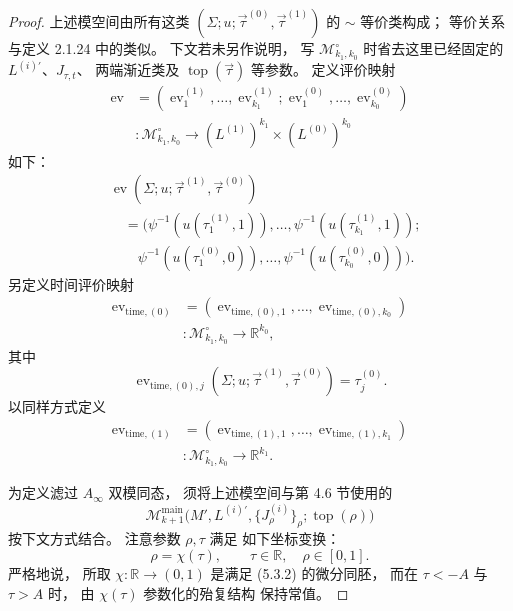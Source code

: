 \begin{proof}
上述模空间由所有这类
$(\Sigma;u;\vec\tau^{(0)},\vec\tau^{(1)})$
的 $\sim$ 等价类构成；
等价关系与定义 2.1.24 中的类似。
下文若未另作说明，
写 $\mathcal M^\circ_{k_1,k_0}$
时省去这里已经固定的
$L^{(i)\prime}$、$J_{\tau,t}$、
两端渐近类及 $\operatorname{top}(\vec\tau)$
等参数。
定义评价映射
\[
\begin{aligned}
\operatorname{ev}
&=(\operatorname{ev}^{(1)}_1,\ldots,
 \operatorname{ev}^{(1)}_{k_1};
 \operatorname{ev}^{(0)}_1,\ldots,
 \operatorname{ev}^{(0)}_{k_0})
\\
&\colon
\mathcal M^\circ_{k_1,k_0}
\longrightarrow
(L^{(1)})^{k_1}\times(L^{(0)})^{k_0}
\end{aligned}
\]
如下：
\[
\begin{aligned}
&\operatorname{ev}
(\Sigma;u;\vec\tau^{(1)},\vec\tau^{(0)})
\\
&\quad=
\bigl(
 \psi^{-1}(u(\tau^{(1)}_1,1)),\ldots,
 \psi^{-1}(u(\tau^{(1)}_{k_1},1));
\\
&\qquad
 \psi^{-1}(u(\tau^{(0)}_1,0)),\ldots,
 \psi^{-1}(u(\tau^{(0)}_{k_0},0))
\bigr).
\end{aligned}
\]
另定义时间评价映射
\[
\begin{aligned}
\operatorname{ev}_{\mathrm{time},(0)}
&=(\operatorname{ev}_{\mathrm{time},(0),1},
  \ldots,
  \operatorname{ev}_{\mathrm{time},(0),k_0})
\\
&\colon\mathcal M^\circ_{k_1,k_0}
\longrightarrow\mathbb R^{k_0},
\end{aligned}
\]
其中
\[
\operatorname{ev}_{\mathrm{time},(0),j}
(\Sigma;u;\vec\tau^{(1)},\vec\tau^{(0)})
=\tau_j^{(0)}.
\]
以同样方式定义
\[
\begin{aligned}
\operatorname{ev}_{\mathrm{time},(1)}
&=(\operatorname{ev}_{\mathrm{time},(1),1},
  \ldots,
  \operatorname{ev}_{\mathrm{time},(1),k_1})
\\
&\colon\mathcal M^\circ_{k_1,k_0}
\longrightarrow\mathbb R^{k_1}.
\end{aligned}
\]

为定义滤过 $A_\infty$ 双模同态，
须将上述模空间与第 4.6 节使用的
\[
\mathcal M_{k+1}^{\mathrm{main}}
\bigl(M',L^{(i)\prime},
 \{J^{(i)}_\rho\}_\rho;
 \operatorname{top}(\rho)\bigr)
\]
按下文方式结合。
注意参数 $\rho,\tau$ 满足
如下坐标变换：
\[
\rho=\chi(\tau),
\qquad \tau\in\mathbb R,\quad \rho\in[0,1].
\]
严格地说，
所取 $\chi\colon\mathbb R\to(0,1)$
是满足 (5.3.2) 的微分同胚，
而在 $\tau<-A$ 与 $\tau>A$ 时，
由 $\chi(\tau)$ 参数化的殆复结构
保持常值。


\end{proof}
